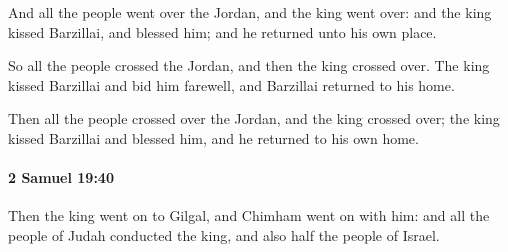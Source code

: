 			\begin{versebox}
					\item[BHS] 
					\item[ASV] And all the people went over the Jordan, and the king went over: and the king kissed Barzillai, and blessed him; and he returned unto his own place.
					\item[NIV] So all the people crossed the Jordan, and then the king crossed over. The king kissed Barzillai and bid him farewell, and Barzillai returned to his home.
					\item[NRSV] Then all the people crossed over the Jordan, and the king crossed over; the king kissed Barzillai and blessed him, and he returned to his own home.
			\end{versebox}

		\paragraph{2 Samuel 19:40} %
			\label{2SAMUEL-19-40}

			Then the king went on to Gilgal, and Chimham went on with him: and all the people of Judah conducted the king, and also half the people of Israel.

